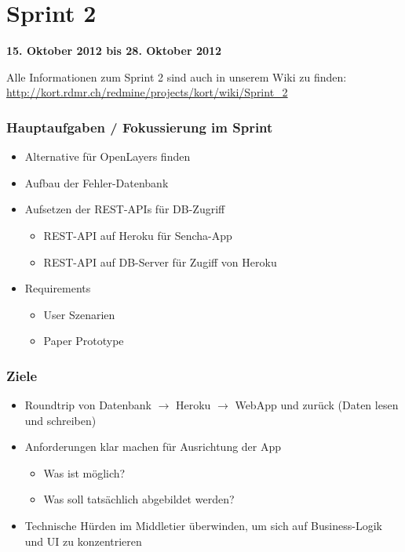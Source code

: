 \section{Sprint 2}

\textbf{15. Oktober 2012 bis 28. Oktober 2012}

Alle Informationen zum Sprint 2 sind auch in unserem Wiki zu finden:
\url{http://kort.rdmr.ch/redmine/projects/kort/wiki/Sprint_2}

\subsubsection{Hauptaufgaben / Fokussierung im Sprint}

\begin{itemize}
	\item Alternative für OpenLayers finden
	\item Aufbau der Fehler-Datenbank
	\item Aufsetzen der REST-APIs für DB-Zugriff
	\begin{itemize}
		\item REST-API auf Heroku für Sencha-App
		\item REST-API auf DB-Server für Zugiff von Heroku
	\end{itemize}
	\item Requirements
	\begin{itemize}
		\item User Szenarien
		\item Paper Prototype
	\end{itemize}
\end{itemize}

\subsubsection{Ziele}
\begin{itemize}
	\item Roundtrip von Datenbank $\rightarrow$ Heroku $\rightarrow$ \gls{WebApp} und zurück (Daten lesen und schreiben)
	\item Anforderungen klar machen für Ausrichtung der App
	\begin{itemize}
		\item Was ist möglich?
		\item Was soll tatsächlich abgebildet werden?
	\end{itemize}
	\item Technische Hürden im Middletier überwinden, um sich auf Business-Logik und UI zu konzentrieren
\end{itemize}

